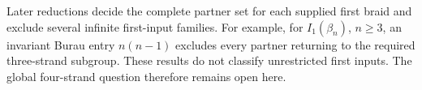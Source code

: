 Later reductions decide the complete partner set for each supplied
first braid and exclude several infinite first-input families. For
example, for $I_1(\beta_n)$, $n\ge3$, an invariant Burau entry
$n(n-1)$ excludes every partner returning to the required three-strand
subgroup. These results do not classify unrestricted first inputs.
The global four-strand question therefore remains open here.

